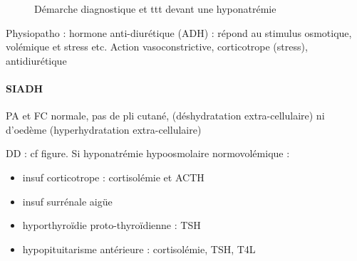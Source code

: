 \documentclass[11pt]{article}
\begin{document}
\begin{figure}[htpb]
  \centering
  \caption{Démarche diagnostique et ttt devant une hyponatrémie}
\end{figure}

Physiopatho : hormone anti-diurétique (ADH) : répond au stimulus osmotique,
volémique et stress etc. Action vasoconstrictive, corticotrope (stress),
antidiurétique

\paragraph{SIADH}
\label{sec:orgfdae7c5}
PA et FC normale, pas de pli cutané, (déshydratation extra-cellulaire) ni
d'oedème (hyperhydratation extra-cellulaire)

DD : cf figure. Si hyponatrémie hypoosmolaire normovolémique :
\begin{itemize}
\item insuf corticotrope : cortisolémie et ACTH
\item insuf surrénale aigüe
\item hyporthyroïdie proto-thyroïdienne : TSH \inc
\item hypopituitarisme antérieure : cortisolémie, TSH, T4L
\end{itemize}
\end{document}
